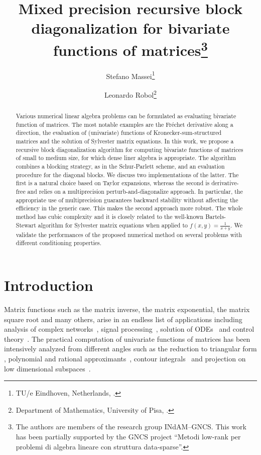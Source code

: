 \documentclass{siamart1116}
\author{
	Stefano Massei\thanks{TU/e Eindhoven, Netherlands,
		\email{s.massei@tue.nl}.} \and
	Leonardo Robol\thanks{Department of Mathematics, University of Pisa, 
		\email{leonardo.robol@unipi.it}.}
}
\title{Mixed precision recursive block diagonalization  for bivariate functions of matrices\thanks{The authors are members of the research group
                INdAM--GNCS. This work has been partially supported by
                the GNCS project ``Metodi low-rank per problemi di algebra lineare
                con struttura data-sparse''.}}
\begin{document}
\maketitle
\begin{abstract}
Various numerical linear algebra problems can be formulated
as evaluating bivariate function of matrices. The most
 notable examples are the Fr\'echet
derivative along a direction, the evaluation of 
(univariate) functions of Kronecker-sum-structured matrices
and the solution of Sylvester matrix equations. In this 
work, we propose a recursive block diagonalization algorithm 
for computing bivariate functions of matrices of small to
medium size, for which dense liner algebra is appropriate. 
The algorithm combines a blocking strategy, as in the 
Schur-Parlett scheme, and an evaluation procedure for the
diagonal blocks. We discuss two implementations of the latter. 
The first is a natural choice based on Taylor expansions, whereas the second
is derivative-free and relies on a multiprecision 
perturb-and-diagonalize approach. In particular, the
appropriate use of multiprecision guarantees backward stability
without affecting the efficiency in the generic case. This makes the second approach more robust. The whole
method has cubic complexity and it is closely related
to the well-known Bartels-Stewart algorithm for Sylvester 
matrix equations when applied to $f(x,y)=\frac{1}{x+y}$. We validate the performances of the proposed numerical method  on several problems with different conditioning properties. 
	\end{abstract}
\section{Introduction}
Matrix functions \cite{higham2008functions} such as the matrix inverse, the matrix exponential, the matrix square root and many others, arise in an endless list of applications including analysis of complex networks~\cite{estrada2010network}, signal processing~\cite{hjorungnes2011complex}, solution of ODEs~\cite{hochbruck2010exponential} and control theory~\cite{antoulas2005approximation}. The  practical computation of univariate functions of matrices has been intensively analyzed from different angles such as the reduction to triangular form
\cite{davies2003schur}, polynomial and rational approximants~\cite{higham2009scaling}, contour integrals~\cite{hale2008computing} and projection on low dimensional subspaces~\cite{guttel2010rational}.
\end{document}
